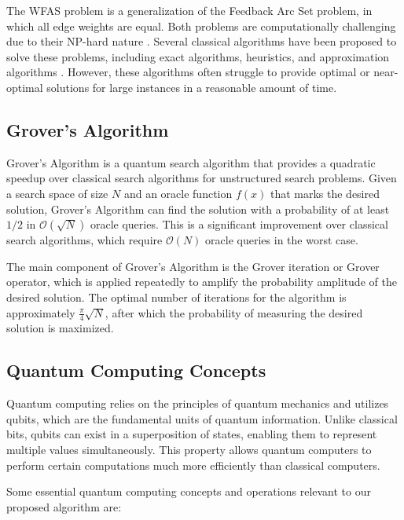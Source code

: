 The WFAS problem is a generalization of the Feedback Arc Set problem, in which all edge weights are equal. Both problems are computationally challenging due to their NP-hard nature \cite{nphard}. Several classical algorithms have been proposed to solve these problems, including exact algorithms, heuristics, and approximation algorithms \cite{classical}. However, these algorithms often struggle to provide optimal or near-optimal solutions for large instances in a reasonable amount of time.

\subsection{Grover's Algorithm}

Grover's Algorithm \cite{grover} is a quantum search algorithm that provides a quadratic speedup over classical search algorithms for unstructured search problems. Given a search space of size $N$ and an oracle function $f(x)$ that marks the desired solution, Grover's Algorithm can find the solution with a probability of at least $1/2$ in $\mathcal{O}(\sqrt{N})$ oracle queries. This is a significant improvement over classical search algorithms, which require $\mathcal{O}(N)$ oracle queries in the worst case.

The main component of Grover's Algorithm is the Grover iteration or Grover operator, which is applied repeatedly to amplify the probability amplitude of the desired solution. The optimal number of iterations for the algorithm is approximately $\frac{\pi}{4}\sqrt{N}$, after which the probability of measuring the desired solution is maximized.

\subsection{Quantum Computing Concepts}

Quantum computing relies on the principles of quantum mechanics and utilizes qubits, which are the fundamental units of quantum information. Unlike classical bits, qubits can exist in a superposition of states, enabling them to represent multiple values simultaneously. This property allows quantum computers to perform certain computations much more efficiently than classical computers.

Some essential quantum computing concepts and operations relevant to our proposed algorithm are:

